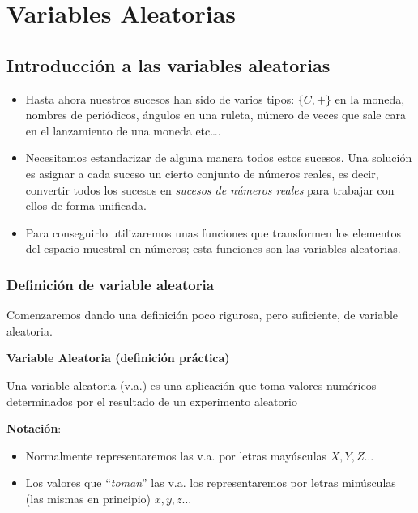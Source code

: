 \documentclass[]{book}
\providecommand{\tightlist}{%
  \setlength{\itemsep}{0pt}\setlength{\parskip}{0pt}}
\begin{document}
\hypertarget{variables-aleatorias}{%
\chapter{Variables Aleatorias}\label{variables-aleatorias}}

\hypertarget{introducciuxf3n-a-las-variables-aleatorias}{%
\section{Introducción a las variables aleatorias}\label{introducciuxf3n-a-las-variables-aleatorias}}

\begin{itemize}
\tightlist
\item
  Hasta ahora nuestros sucesos han sido de varios tipos: \(\{C,+\}\) en
  la moneda, nombres de periódicos, ángulos en una ruleta, número de
  veces que sale cara en el lanzamiento de una moneda etc\ldots.
\item
  Necesitamos estandarizar de alguna manera todos estos sucesos. Una
  solución es asignar a cada suceso un cierto conjunto de
  números reales, es decir, convertir todos los sucesos en
  \emph{sucesos de números reales} para trabajar con ellos de forma
  unificada.
\item
  Para conseguirlo utilizaremos unas funciones que
  transformen los elementos del espacio muestral en números; esta funciones son las
  variables aleatorias.
\end{itemize}

\hypertarget{definiciuxf3n-de-variable-aleatoria}{%
\subsection{Definición de variable aleatoria}\label{definiciuxf3n-de-variable-aleatoria}}

Comenzaremos dando una definición poco rigurosa, pero suficiente, de variable aleatoria.

 \textbf{Variable Aleatoria (definición práctica)}

Una variable aleatoria (v.a.) es una aplicación que toma valores numéricos determinados por el resultado de un experimento aleatorio

\textbf{Notación}:

\begin{itemize}
\tightlist
\item
  Normalmente representaremos las v.a. por letras mayúsculas \(X,Y,Z\ldots\)
\item
  Los valores que ``\emph{toman}'' las v.a. los representaremos por letras minúsculas (las mismas en principio) \(x,y,z\ldots\)
\end{itemize}
\end{document}
